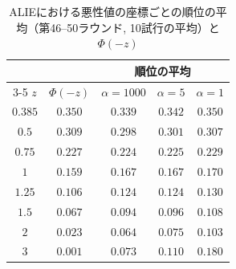 \documentclass[a4j, twocolumn, dvipdfmx]{jsarticle}
\begin{document}
\begin{table}[H]
\centering
\caption{ALIEにおける悪性値の座標ごとの順位の平均（第46--50ラウンド, 10試行の平均）と $\Phi(-z)$}
\label{tab:rank}
\begin{tabular}{@{}ccccc@{}}
\toprule
 & & \multicolumn{3}{c}{順位の平均} \\
\cmidrule(l){3-5}
$z$ & $\Phi(-z)$ & $\alpha=1000$ & $\alpha=5$ & $\alpha=1$ \\
\midrule
$0.385$ & $0.350$ & $0.339$ & $0.342$ & $0.350$ \\
$0.5$ & $0.309$ & $0.298$ & $0.301$ & $0.307$ \\
$0.75$ & $0.227$ & $0.224$ & $0.225$ & $0.229$ \\
$1$ & $0.159$ & $0.167$ & $0.167$ & $0.170$ \\
$1.25$ & $0.106$ & $0.124$ & $0.124$ & $0.130$ \\
$1.5$ & $0.067$ & $0.094$ & $0.096$ & $0.108$ \\
$2$ & $0.023$ & $0.064$ & $0.075$ & $0.103$ \\
$3$ & $0.001$ & $0.073$ & $0.110$ & $0.180$ \\
\bottomrule
\end{tabular}
\end{table}
\end{document}
